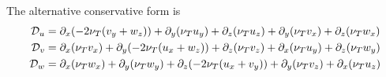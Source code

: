 The alternative conservative form is 
\begin{align*}
   {\cal D}_u &= \partial_x( -2\nu_T(v_y+w_z)) + \partial_y( \nu_T u_y) + \partial_z( \nu_T u_z ) 
                    + \partial_y( \nu_T v_x ) + \partial_z( \nu_T w_x ) \\
   {\cal D}_v &= \partial_x( \nu_T v_x) + \partial_y(-2\nu_T(u_x+w_z)) + \partial_z( \nu_T v_z ) 
                    + \partial_x( \nu_T u_y ) + \partial_z( \nu_T w_y ) \\
   {\cal D}_w &= \partial_x( \nu_T w_x) + \partial_y( \nu_T w_y) + \partial_z(-2\nu_T(u_x+v_y) ) 
                    + \partial_y( \nu_T v_z ) + \partial_x( \nu_T u_z ) \\
\end{align*}





